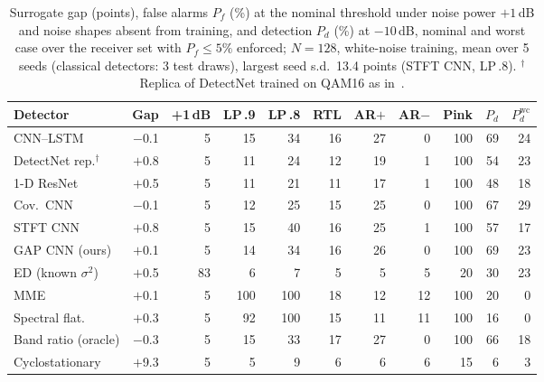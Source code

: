 \begin{table}[t]
\centering
\caption{Surrogate gap (points), false alarms $P_f$ (\%) at the nominal threshold under noise power $+1$\,dB and noise shapes absent from training, and detection $P_d$ (\%) at $-10$\,dB, nominal and worst case over the receiver set with $P_f\le5\%$ enforced; $N=128$, white-noise training, mean over 5 seeds (classical detectors: 3 test draws), largest seed s.d.\ 13.4 points (STFT CNN, LP\,.8). $^{\dagger}$Replica of DetectNet trained on QAM16 as in~\cite{gao2019deep}.}
\label{tab:main}
\footnotesize
\setlength{\tabcolsep}{1.5pt}
\begin{tabular}{lrrrrrrrrrr}
\toprule
Detector & Gap & +1\,dB & LP\,.9 & LP\,.8 & RTL & AR$+$ & AR$-$ & Pink & $P_d$ & $P_d^{\mathrm{wc}}$ \\
\midrule
CNN--LSTM~\cite{gao2019deep} & $-$0.1 & 5 & 15 & 34 & 16 & 27 & 0 & 100 & 69 & 24 \\
DetectNet rep.$^{\dagger}$ & $+$0.8 & 5 & 11 & 24 & 12 & 19 & 1 & 100 & 54 & 23 \\
1-D ResNet~\cite{zheng2020spectrum} & $+$0.5 & 5 & 11 & 21 & 11 & 17 & 1 & 100 & 48 & 18 \\
Cov.\ CNN~\cite{liu2019cmcnn} & $-$0.1 & 5 & 12 & 25 & 15 & 25 & 0 & 100 & 67 & 29 \\
STFT CNN~\cite{chen2021stft} & $+$0.8 & 5 & 15 & 40 & 16 & 25 & 1 & 100 & 57 & 17 \\
GAP CNN (ours) & $+$0.1 & 5 & 14 & 34 & 16 & 26 & 0 & 100 & 69 & 23 \\
\midrule
ED (known $\sigma^2$) & $+$0.5 & 83 & 6 & 7 & 5 & 5 & 5 & 20 & 30 & 23 \\
MME~\cite{zeng2009eigen} & $+$0.1 & 5 & 100 & 100 & 18 & 12 & 12 & 100 & 20 & 0 \\
Spectral flat. & $+$0.3 & 5 & 92 & 100 & 15 & 11 & 11 & 100 & 16 & 0 \\
Band ratio (oracle) & $-$0.3 & 5 & 15 & 33 & 17 & 27 & 0 & 100 & 66 & 18 \\
Cyclostationary & $+$9.3 & 5 & 5 & 9 & 6 & 6 & 6 & 15 & 6 & 3 \\
\bottomrule
\end{tabular}
\end{table}
